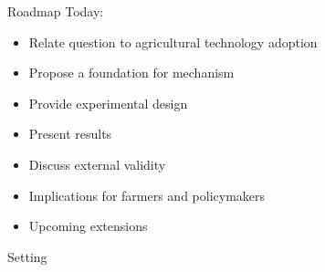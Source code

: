 \documentclass[
  ignorenonframetext,
]{beamer}
\providecommand{\tightlist}{%
  \setlength{\itemsep}{0pt}\setlength{\parskip}{0pt}}\usepackage{longtable,booktabs,array}
\begin{document}
\begin{frame}{Roadmap}
\protect\hypertarget{roadmap}{}
Today:

\begin{itemize}[<+->]
\tightlist
\item
  Relate question to agricultural technology adoption
\item
  Propose a foundation for mechanism
\item
  Provide experimental design
\item
  Present results
\item
  Discuss external validity
\item
  Implications for farmers and policymakers
\item
  Upcoming extensions
\end{itemize}
\end{frame}

\begin{frame}{Setting}
\protect\hypertarget{setting}{}
\end{frame}
\end{document}
